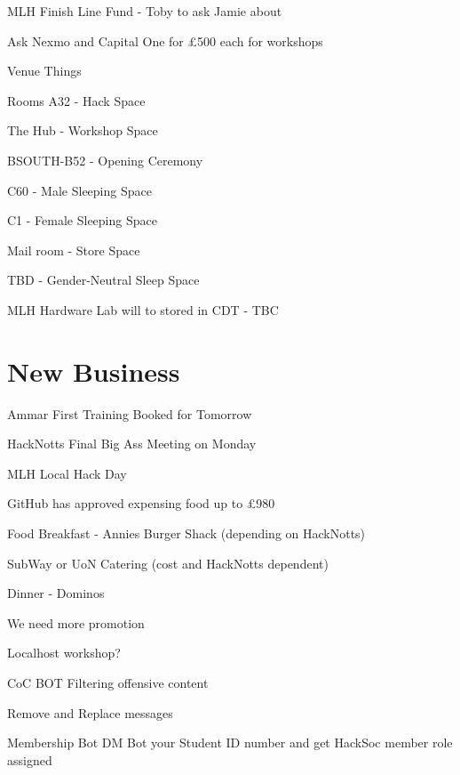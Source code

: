 \documentclass[11pt,hacksoc]{meetingmins}
\begin{document}
\begin{hiddensubitems}
		\subitem
		MLH Finish Line Fund - Toby to ask Jamie about
		
		\subitem
		Ask Nexmo and Capital One for \pounds500 each for workshops
	
	\item
	Venue Things
	
		\subitem
		Rooms
			\subsubitem
			A32 - Hack Space
			
			\subsubitem
			The Hub - Workshop Space
			
			\subsubitem
			BSOUTH-B52 - Opening Ceremony				
			
			\subsubitem
			C60 - Male Sleeping Space
			
			\subsubitem
			C1 - Female Sleeping Space
			
			\subsubitem
			Mail room - Store Space
			
			\subsubitem
			TBD - Gender-Neutral Sleep Space
			
		\subitem
		MLH Hardware Lab will to stored in CDT - TBC
			
\end{hiddensubitems}

\section{New Business}
\begin{items}
	\item
	Ammar First Training Booked for Tomorrow
	
	\item
	HackNotts Final Big Ass Meeting on Monday
	
	\item
	MLH Local Hack Day
	
		\subitem
		GitHub has approved expensing food up to \pounds980
		
		\subitem
		Food
			\subsubitem
			Breakfast - Annies Burger Shack (depending on HackNotts)
			
			\subsubitem
			SubWay or UoN Catering (cost and HackNotts dependent)
			
			\subsubitem
			Dinner - Dominos
			
		\subitem
		We need more promotion
		
		\subitem
		Localhost workshop?
		
	\item
	CoC BOT
		\subitem
		Filtering offensive content
		
		\subitem
		Remove and Replace messages
		
	\item
	Membership Bot
		\subitem
		DM Bot your Student ID number and get HackSoc member role assigned
\end{items}

\vspace{1em}
\end{document}

